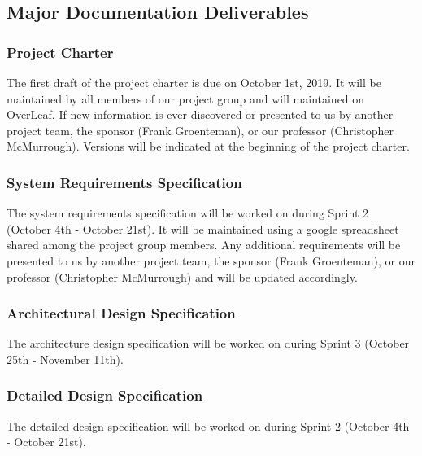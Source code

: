 
\subsection{Major Documentation Deliverables}


\subsubsection{Project Charter}
The first draft of the project charter is due on October 1st, 2019. It will be maintained by all members of our project group and will maintained on OverLeaf. If new information is ever discovered or presented to us by another project team, the sponsor (Frank Groenteman), or our professor (Christopher McMurrough). Versions will be indicated at the beginning of the project charter. 

\subsubsection{System Requirements Specification}
The system requirements specification will be worked on during Sprint 2 (October 4th - October 21st). It will be maintained using a google spreadsheet shared among the project group members. Any additional requirements will be presented to us by another project team, the sponsor (Frank Groenteman), or our professor (Christopher McMurrough) and will be updated accordingly.


\subsubsection{Architectural Design Specification}
The architecture design specification will be worked on during Sprint 3 (October 25th - November 11th). 

\subsubsection{Detailed Design Specification}
The detailed design specification will be worked on during Sprint 2 (October 4th - October 21st).

